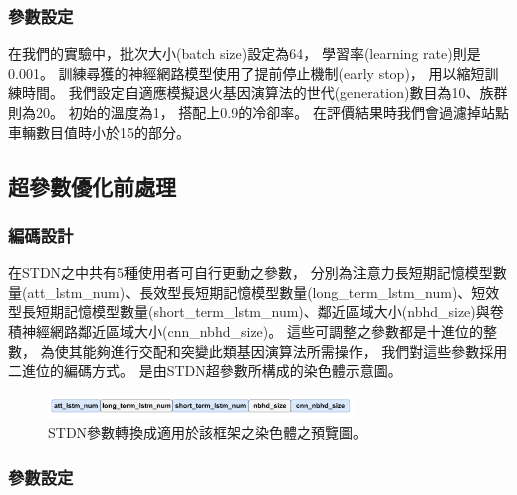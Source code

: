 \documentclass[a4paper,12pt]{extarticle}
\begin{document}
            \subsubsection{參數設定}
                \label{subsubsec:parameters_setting}
                在我們的實驗中，批次大小(batch size)設定為64，
                學習率(learning rate)則是0.001。
                訓練尋獲的神經網路模型使用了提前停止機制(early stop)，
                用以縮短訓練時間。
                我們設定自適應模擬退火基因演算法的世代(generation)數目為10、族群則為20。
                初始的溫度為1，
                搭配上0.9的冷卻率。
                在評價結果時我們會過濾掉站點車輛數目值時小於15的部分。

            \subsection{超參數優化前處理}
                \subsubsection{編碼設計}

                    在STDN之中共有5種使用者可自行更動之參數，
                    分別為注意力長短期記憶模型數量(att\_lstm\_num)、長效型長短期記憶模型數量(long\_term\_lstm\_num)、短效型長短期記憶模型數量(short\_term\_lstm\_num)、鄰近區域大小(nbhd\_size)與卷積神經網路鄰近區域大小(cnn\_nbhd\_size)。
                    這些可調整之參數都是十進位的整數，
                    為使其能夠進行交配和突變此類基因演算法所需操作，
                    我們對這些參數採用二進位的編碼方式。
                    是由STDN超參數所構成的染色體示意圖。
                    \begin{figure}[htbp]
                        \centering
                        \includegraphics[width=0.725\textwidth]{chromosome_scheme.pdf}
                        \caption{
                            STDN參數轉換成適用於該框架之染色體之預覽圖。
                        }
                        \label{fig:chromosome_sheme}
                    \end{figure}

                \subsubsection{參數設定}
\end{document}
